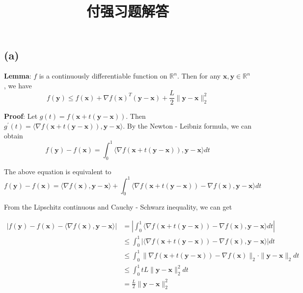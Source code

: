 \documentclass{article}
\title{付强习题解答}
\author{}
\date{}
\begin{document}
	
	\maketitle
	
\section{}
\subsection*{(a)}

\textbf{Lemma}: $ f $ is a continuously differentiable function on $\mathbb{R}^n $. Then for any $ \mathbf{x}, \mathbf{y} \in \mathbb{R}^n$, we have
$$
f(\mathbf{y}) \leq f(\mathbf{x}) + \nabla f(\mathbf{x})^T (\mathbf{y} - \mathbf{x}) + \frac{L}{2} \|\mathbf{y} - \mathbf{x}\|_2^2
$$

\textbf{Proof}: Let $ g(t) = f(\mathbf{x} + t(\mathbf{y} - \mathbf{x})) $. Then $ g^\prime(t) = \langle \nabla f(\mathbf{x} + t(\mathbf{y} - \mathbf{x})), \mathbf{y} - \mathbf{x} \rangle $. By the Newton - Leibniz formula, we can obtain
$$
f(\mathbf{y}) - f(\mathbf{x}) = \int_0^1 \langle \nabla f(\mathbf{x} + t(\mathbf{y} - \mathbf{x})), \mathbf{y} - \mathbf{x} \rangle dt
$$

The above equation is equivalent to
$$
f(\mathbf{y}) - f(\mathbf{x}) = \langle \nabla f(\mathbf{x}), \mathbf{y} - \mathbf{x} \rangle + \int_0^1 \langle \nabla f(\mathbf{x} + t(\mathbf{y} - \mathbf{x})) - \nabla f(\mathbf{x}), \mathbf{y} - \mathbf{x} \rangle dt
$$

From the Lipschitz continuous and  Cauchy - Schwarz inequality, we can get

\begin{align*}
	|f(\mathbf{y}) - f(\mathbf{x}) - \langle \nabla f(\mathbf{x}), \mathbf{y} - \mathbf{x} \rangle| &= \left| \int_0^1 \langle \nabla f(\mathbf{x} + t(\mathbf{y} - \mathbf{x})) - \nabla f(\mathbf{x}), \mathbf{y} - \mathbf{x} \rangle dt \right| \\
	&\leq \int_0^1 \left| \langle \nabla f(\mathbf{x} + t(\mathbf{y} - \mathbf{x})) - \nabla f(\mathbf{x}), \mathbf{y} - \mathbf{x} \rangle \right| dt \\
	&\leq \int_0^1 \|\nabla f(\mathbf{x} + t(\mathbf{y} - \mathbf{x})) - \nabla f(\mathbf{x})\|_2 \cdot \|\mathbf{y} - \mathbf{x}\|_2 dt \\
	&\leq \int_0^1 tL\|\mathbf{y} - \mathbf{x}\|_2^2 dt \\
	&= \frac{L}{2} \|\mathbf{y} - \mathbf{x}\|_2^2
\end{align*}
\end{document}
